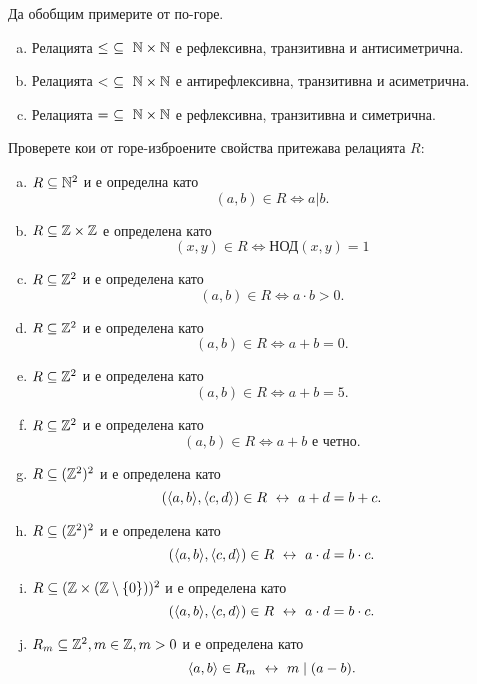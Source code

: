 \begin{example}
  Да обобщим примерите от по-горе.
  \begin{enumerate}[a)]
  \item
    Релацията $\leq\ \subseteq\ \Nat\times\Nat$ е рефлексивна, транзитивна и антисиметрична.
  \item
    Релацията $<\ \subseteq\ \Nat\times\Nat$ е антирефлексивна, транзитивна и асиметрична.
  \item
    Релацията $=\ \subseteq\ \Nat\times\Nat$ е рефлексивна, транзитивна и симетрична.
  \end{enumerate}
\end{example}

\begin{problem}
  Проверете кои от горе-изброените свойства притежава релацията $R$:
  \begin{enumerate}[a)]
  \item
    $R\subseteq \mathbb{N}^2$ и е определна като 
    \[(a,b) \in R \iff a | b.\]
  \item
    $R \subseteq \mathbb{Z}\times \mathbb{Z}$ е определена като
    \[(x,y)\in R \iff \mbox{НОД}(x,y) = 1\]%
  \item
    $R\subseteq \mathbb{Z}^2$ и е определена като
    \[(a,b) \in R \iff a\cdot b > 0.\]
  \item
    $R\subseteq \mathbb{Z}^2$ и е определена като 
    \[(a,b) \in R \iff a+b = 0.\]
  \item
    $R\subseteq \mathbb{Z}^2$ и е определена като
    \[(a,b) \in R \iff a+b = 5.\]
  \item
    $R\subseteq \mathbb{Z}^2$ и е определена като 
    \[(a,b) \in R \iff a+b\mbox{ е четно}.\]
  \item
    $R\subseteq (\mathbb{Z}^2)^2$ и е определена като
    \[(\langle{a,b}\rangle, \langle{c,d}\rangle) \in R \ \leftrightarrow\  a+d = b+c.\]
  \item
    $R\subseteq (\mathbb{Z}^2)^2$ и е определена като
    \[(\langle{a,b}\rangle,\langle{c,d}\rangle) \in R \ \leftrightarrow\  a\cdot d = b\cdot c.\]
  \item
    $R\subseteq (\mathbb{Z}\times (\mathbb{Z}\setminus\{0\}))^2$ и е определена като
    \[(\langle{a,b}\rangle,\langle{c,d}\rangle) \in R \ \leftrightarrow\  a\cdot d = b\cdot c.\]
  \item
    $R_{m}\subseteq \mathbb{Z}^2, m\in \mathbb{Z}, m>0$ и е определена като
    \[\langle{a,b}\rangle \in R_m \ \leftrightarrow\  m\mid (a - b).\]

\end{enumerate}
\end{problem}
